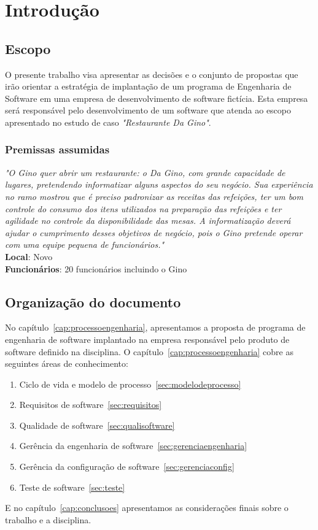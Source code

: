 \chapter{Introdução}
\label{cap:introducao}

\section{Escopo}

O presente trabalho visa apresentar as decisões e o conjunto de propostas que irão orientar a estratégia de implantação de um programa de Engenharia de Software em uma empresa de desenvolvimento de software fictícia. Esta empresa será responsável pelo desenvolvimento de um software que atenda ao escopo apresentado no estudo de caso \textit{"Restaurante Da Gino"}.

\subsection{Premissas assumidas}

\emph{"O Gino quer abrir um restaurante: o Da Gino, com grande capacidade de lugares, pretendendo informatizar alguns aspectos do seu negócio. Sua experiência no ramo mostrou que é preciso padronizar as receitas das refeições, ter um bom controle do consumo dos itens utilizados na preparação das refeições e ter agilidade no controle da disponibilidade das mesas. A informatização deverá ajudar o cumprimento desses objetivos de negócio, pois o Gino pretende operar com uma equipe pequena de funcionários."}\\
\textbf{Local}: Novo\\
\textbf{Funcionários}: 20 funcionários incluindo o Gino

\section{Organização do documento}
\label{sec:organizacao_trabalho}

No capítulo~\ref{cap:processoengenharia}, apresentamos a proposta de programa de engenharia de software implantado na empresa responsável pelo produto de software definido na disciplina. O capítulo~\ref{cap:processoengenharia} cobre as seguintes áreas de conhecimento:

\begin{enumerate}
	\item Ciclo de vida e modelo de processo~\ref{sec:modelodeprocesso}
	\item Requisitos de software~\ref{sec:requisitos}
	\item Qualidade de software~\ref{sec:qualisoftware}
	\item Gerência da engenharia de software~\ref{sec:gerenciaengenharia}
	\item Gerência da configuração de software~\ref{sec:gerenciaconfig}
	\item Teste de software~\ref{sec:teste}
\end{enumerate}

 E no capítulo~\ref{cap:conclusoes} apresentamos as considerações finais sobre o trabalho e a disciplina.


